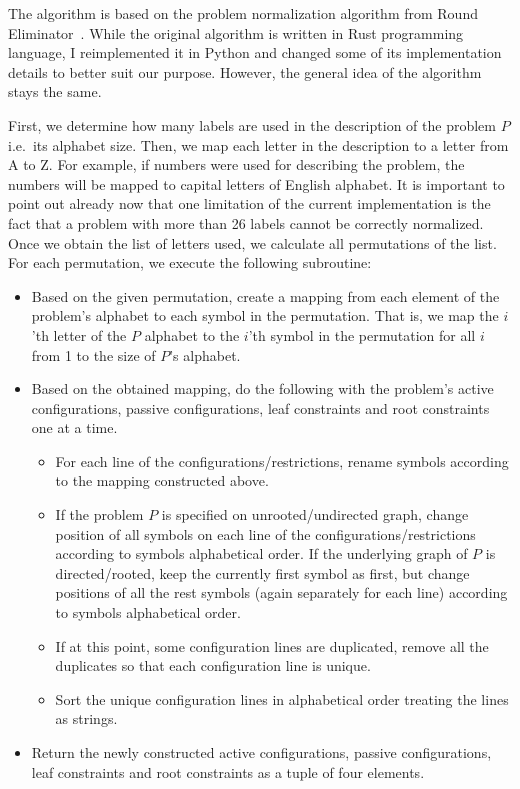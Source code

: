 The algorithm is based on the problem normalization algorithm
from Round Eliminator~\cite{Olivetti2020}. While the original
algorithm is written in Rust programming language, I
reimplemented it in Python and changed some of its
implementation details to better suit our purpose.
However, the general idea of the algorithm stays the same.

First, we determine how many labels are used in the description of the
problem $P$ i.e.\ its alphabet size. Then, we map each letter in the description
to a letter from A to Z. For example, if numbers were used for describing
the problem, the numbers will be mapped to capital letters of
English alphabet. It is important to point out already now that
one limitation of the current implementation is the fact that
a problem with more than 26 labels cannot be correctly normalized.
Once we obtain the list of letters used, we calculate all
permutations of the list. For each permutation, we execute the following
subroutine:

\begin{itemize}
  \item Based on the given permutation, create a mapping from each
  element of the problem's alphabet to each symbol in the permutation.
  That is, we map the $i$'th letter of the $P$ alphabet to the $i$'th symbol
  in the permutation for all $i$ from 1 to the size of $P$'s alphabet.
  \item Based on the obtained mapping, do the following with the problem's
  active configurations, passive configurations, leaf constraints and
  root constraints one at a time.
  
  \begin{itemize}
    \item For each line of the configurations/restrictions, rename symbols
    according to the mapping constructed above.
    \item If the problem $P$ is specified on unrooted/undirected graph,
    change position of all symbols on each line of the configurations/restrictions according to symbols alphabetical order.
    If the underlying graph of $P$ is directed/rooted, keep the currently first
    symbol as first, but change positions of all the rest symbols (again separately for each line)
    according to symbols alphabetical order.
    \item If at this point, some configuration lines are
    duplicated, remove all the duplicates so that each configuration
    line is unique.
    \item Sort the unique configuration lines in alphabetical order
    treating the lines as strings.
  \end{itemize}

  \item Return the newly constructed active configurations,
  passive configurations, leaf constraints and root constraints as
  a tuple of four elements.
\end{itemize}

